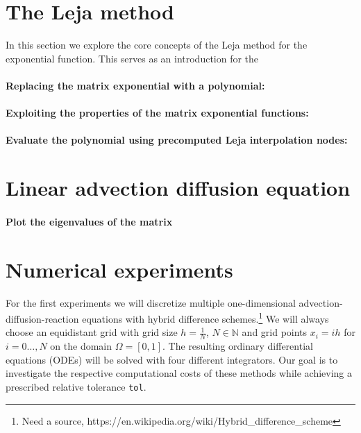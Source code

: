 \documentclass{scrartcl}
\begin{document}
\section{The Leja method}
In this section we explore the core concepts of the Leja method for the exponential function. This serves as an introduction for the 

\paragraph{Replacing the matrix exponential with a polynomial:}

\paragraph{Exploiting the properties of the matrix exponential functions:}

\paragraph{Evaluate the polynomial using precomputed Leja interpolation nodes:}

\section{Linear advection diffusion equation}

\paragraph{Plot the eigenvalues of the matrix}


\section{Numerical experiments}
For the first experiments we will discretize multiple one-dimensional advection-diffusion-reaction equations with hybrid difference schemes.\footnote{Need a source, https://en.wikipedia.org/wiki/Hybrid\_difference\_scheme} We will always choose an equidistant grid with grid size $h = \frac{1}{N}$, $N\in\mathbb{N}$ and grid points $x_i = ih$ for $i=0\dots,N$ on the domain $\Omega = [0,1]$. The resulting ordinary differential equations (ODEs) will be solved with four different integrators. Our goal is to investigate the respective computational costs of these methods while achieving a prescribed relative tolerance \texttt{tol}.
\end{document}
